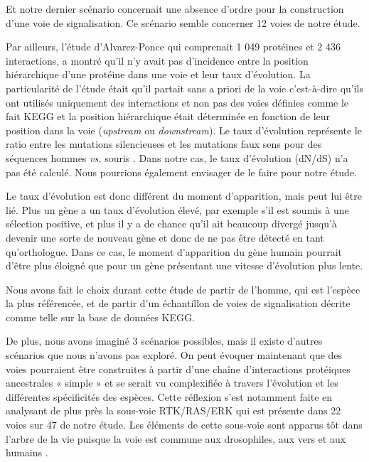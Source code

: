 \par Et notre dernier scénario concernait une absence d’ordre pour la construction d’une voie de signalisation. Ce scénario semble concerner 12 voies de notre étude. 
\par Par ailleurs, l’étude d’Alvarez-Ponce qui comprenait 1 049 protéines et 2 436 interactions, a montré qu’il n’y avait pas d’incidence entre la position hiérarchique d’une protéine dans une voie et leur taux d’évolution. La particularité de l’étude était qu’il partait sans a priori de la voie c’est-à-dire qu’ils ont utilisés uniquement des interactions et non pas des voies définies comme le fait KEGG et la position hiérarchique était déterminée en fonction de leur position dans la voie (\textit{upstream} ou \textit{downstream}). Le taux d’évolution représente le ratio entre les mutations silencieuses et les mutations faux sens pour des séquences hommes \textit{vs.} souris \parencite{alvarez-ponce_relationship_2012}. Dans notre cas, le taux d’évolution (dN/dS) n’a pas été calculé. Nous pourrions également envisager de le faire pour notre étude.
\par Le taux d’évolution est donc différent du moment d’apparition, mais peut lui être lié. Plus un gène a un taux d’évolution élevé, par exemple s’il est soumis à une sélection positive, et plus il y a de chance qu’il ait beaucoup divergé jusqu’à devenir une sorte de nouveau gène et donc de ne pas être détecté en tant qu’orthologue. Dans ce cas, le moment d’apparition du gène humain pourrait d’être plus éloigné que pour un gène présentant une vitesse d’évolution plus lente. 
\par Nous avons fait le choix durant cette étude de partir de l’homme, qui est l’espèce la plus référencée, et de partir d’un échantillon de voies de signalisation décrite comme telle sur la base de données KEGG. 
\par De plus, nous avons imaginé 3 scénarios possibles, mais il existe d’autres scénarios que nous n'avons pas exploré. On peut évoquer maintenant que des voies pourraient être construites à partir d’une chaîne d’interactions protéiques ancestrales « simple » et se serait vu complexifiée à travers l’évolution et les différentes spécificités des espèces. Cette réflexion s’est notamment faite en analysant de plus près la sous-voie RTK/RAS/ERK qui est présente dans 22 voies sur 47 de notre étude. Les éléments de cette sous-voie sont apparus tôt dans l’arbre de la vie puisque la voie est commune aux drosophiles, aux vers et aux humains \parencite{ashton-beaucage_signalisation_2010}. 
